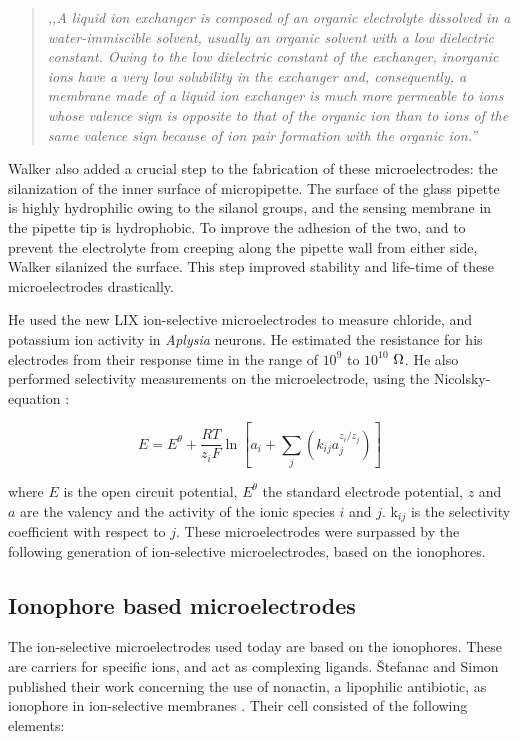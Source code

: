 \begin{quote}
\vspace{0.5cm}
\emph{,,A liquid ion exchanger is composed of an organic electrolyte dissolved in a water-immiscible solvent, usually an organic solvent with a low dielectric constant.
Owing to the low dielectric constant of the exchanger, inorganic ions have a very low solubility in the exchanger and, consequently, a membrane made of a liquid ion exchanger is much more permeable to ions whose valence sign is opposite to that of the organic ion than to ions of the same valence sign because of ion pair formation with the organic ion.''}
\vspace{0.5cm}
\end{quote} 

\label{silanize}
Walker also added a crucial step to the fabrication of these microelectrodes: the silanization of the inner surface of micropipette.
The surface of the glass pipette is highly hydrophilic owing to the silanol groups, and the sensing membrane in the pipette tip is hydrophobic.
To improve the adhesion of the two, and to prevent the electrolyte from creeping along the pipette wall from either side, Walker silanized the surface.
This step improved stability and life-time of these microelectrodes drastically.

He used the new LIX ion-selective microelectrodes to measure chloride, and potassium ion activity in \emph{Aplysia} neurons.
He estimated the resistance for his electrodes from their response time in the range of $10^9$ to $10^{10}$ $\ohm$.
He also performed selectivity measurements on the microelectrode, using the Nicolsky-equation \cite{nicolsky1937theory}:

\begin{equation}
E=E^\theta + \frac{RT}{z_iF} \ln \left [ a_i + \sum_{j} \left ( k_{ij}a_j^{z_i/z_j} \right ) \right ]
\end{equation}

where $E$ is the open circuit potential, $E^\theta$ the standard electrode potential, $z$ and $a$ are the valency and the activity of the ionic species $i$ and $j$. k$_{ij}$ is the selectivity coefficient with respect to $j$.
These microelectrodes were surpassed by the following generation of ion-selective microelectrodes, based on the ionophores.

\subsection{Ionophore based microelectrodes}
The ion-selective microelectrodes used today are based on the ionophores.
These are carriers for specific ions, and act as complexing ligands.
\v{S}tefanac and Simon published their work concerning the use of nonactin, a lipophilic antibiotic, as ionophore in ion-selective membranes \cite{stefanac1966highly, vstefanac1967ion}.
Their cell consisted of the following elements:

